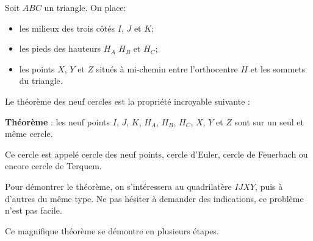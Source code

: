 \begin{exo}
\def\neufpoints{
\tkzDefPoints{0/0/A,6/0/B,1/4/C}

\tkzDefTriangleCenter[centroid](A,B,C)
\tkzGetPoint{G}
\tkzDefSpcTriangle[medial](A,B,C){I,J,K}

\tkzDefSpcTriangle[orthic](A,B,C){H_A,H_B,H_C}
\tkzDefTriangleCenter[ortho](B,C,A)
\tkzGetPoint{H}

\tkzDrawSegments[thin](A,H_A B,H_B C,H_C)
\tkzMarkRightAngles[fill=gray!20,
opacity=.5](A,H_A,C B,H_B,A C,H_C,A)

\tkzDefMidPoint(A,H)\tkzGetPoint{X}
\tkzDefMidPoint(B,H)\tkzGetPoint{Y}
\tkzDefMidPoint(C,H)\tkzGetPoint{Z}
\tkzMarkSegments[size=1.5pt,mark=|](A,X X,H)
\tkzMarkSegments[size=1.5pt,mark=|||](B,Y Y,H)
\tkzMarkSegments[size=1.5pt,mark=||](C,Z Z,H)
\tkzDrawPolygon(A,B,C)
\tkzDrawPoints[size=5pt](I,J,K,H_A,H_B,H_C,X,Y,Z)
\tkzDrawPoints[fill=white,draw=black](H)

}
Soit $ABC$ un triangle.
On place:
\begin{itemize}
\item les milieux des trois côtés $I$, $J$ et $K$;
\item les pieds des hauteurs $H_A$ $H_B$ et $H_C$;
\item les points $X$, $Y$ et $Z$ situés à mi-chemin entre l'orthocentre $H$ et les sommets du triangle.
\end{itemize}
\begin{center}
\end{center}
Le théorème des neuf cercles est la propriété incroyable suivante : 
\begin{mdframed}
\noindent \textbf{Théorème} : les neuf points $I$, $J$, $K$, $H_A$, $H_B$, $H_C$, $X$, $Y$ et $Z$ sont sur un seul et même cercle.
\end{mdframed}
Ce cercle est appelé cercle des neuf points, cercle d'Euler, cercle de Feuerbach ou encore cercle de Terquem.

Pour démontrer le théorème, on s'intéressera au quadrilatère $IJXY$, puis à d'autres du même type. Ne pas hésiter à demander des indications, ce problème n'est pas facile.
\begin{hint}
Ce magnifique théorème se démontre en plusieurs étapes.


\end{hint}
\end{exo}
